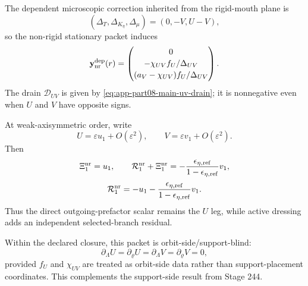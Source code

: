 The dependent microscopic correction inherited from the rigid-mouth plane is
\begin{equation}
\label{eq:app-part08-stage245-dependent-plane}
(\Delta_T,\Delta_{K_\eta},\Delta_\mu)
=(0,-V,U-V),
\end{equation}
so the non-rigid stationary packet induces
\begin{equation}
\label{eq:app-part08-stage245-dependent-nr}
\mathbf y_{\rm nr}^{\rm dep}(r)
=
\begin{pmatrix}
0\\[2pt]
-\chi_{UV}f_U/\Delta_{UV}\\[2pt]
(a_V-\chi_{UV})f_U/\Delta_{UV}
\end{pmatrix}.
\end{equation}
The drain \(\mathcal D_{UV}\) is given by \cref{eq:app-part08-main-uv-drain}; it is nonnegative even when \(U\) and \(V\) have opposite signs.

At weak-axisymmetric order, write
\begin{equation}
\label{eq:app-part08-stage245-first-order-uv}
U=\varepsilon u_1+O(\varepsilon^2),
\qquad
V=\varepsilon v_1+O(\varepsilon^2).
\end{equation}
Then
\begin{equation}
\label{eq:app-part08-stage245-xi-r-first}
\Xi_1^{\rm nr}=u_1,
\qquad
\mathcal R_1^{\rm nr}+\Xi_1^{\rm nr}
=-\frac{\epsilon_{\eta,{\rm ref}}}{1-\epsilon_{\eta,{\rm ref}}}v_1,
\end{equation}
\begin{equation}
\label{eq:app-part08-stage245-r-first}
\mathcal R_1^{\rm nr}
=
-u_1-
\frac{\epsilon_{\eta,{\rm ref}}}{1-\epsilon_{\eta,{\rm ref}}}v_1.
\end{equation}
Thus the direct outgoing-prefactor scalar remains the \(U\) leg, while active dressing adds an independent selected-branch residual.

Within the declared closure, this packet is orbit-side/support-blind:
\begin{equation}
\label{eq:app-part08-stage245-support-blind}
\partial_\Lambda U=
\partial_\varrho U=
\partial_\Lambda V=
\partial_\varrho V=0,
\end{equation}
provided \(f_U\) and \(\chi_{UV}\) are treated as orbit-side data rather than support-placement coordinates.  This complements the support-side result from Stage 244.

